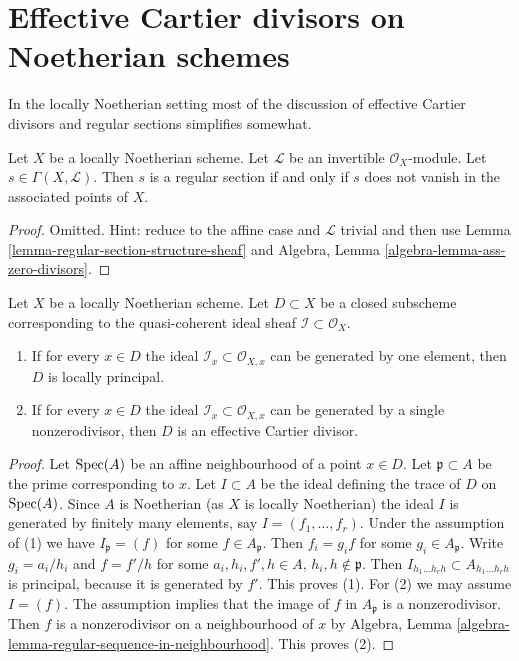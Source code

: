 \section{Effective Cartier divisors on Noetherian schemes}
\label{section-Noetherian-effective-Cartier}

\noindent
In the locally Noetherian setting most of the discussion of
effective Cartier divisors and regular sections simplifies somewhat.

\begin{lemma}
\label{lemma-regular-section-associated-points}
Let $X$ be a locally Noetherian scheme. Let $\mathcal{L}$ be an invertible
$\mathcal{O}_X$-module. Let $s \in \Gamma(X, \mathcal{L})$. Then $s$
is a regular section if and only if $s$ does not vanish in the associated
points of $X$.
\end{lemma}

\begin{proof}
Omitted. Hint: reduce to the affine case and $\mathcal{L}$ trivial
and then use Lemma \ref{lemma-regular-section-structure-sheaf} and
Algebra, Lemma \ref{algebra-lemma-ass-zero-divisors}.
\end{proof}

\begin{lemma}
\label{lemma-effective-Cartier-in-points}
Let $X$ be a locally Noetherian scheme. Let $D \subset X$ be a closed subscheme
corresponding to the quasi-coherent ideal sheaf
$\mathcal{I} \subset \mathcal{O}_X$.
\begin{enumerate}
\item If for every $x \in D$ the ideal
$\mathcal{I}_x \subset \mathcal{O}_{X, x}$
can be generated by one element, then $D$ is locally principal.
\item If for every $x \in D$ the ideal
$\mathcal{I}_x \subset \mathcal{O}_{X, x}$
can be generated by a single nonzerodivisor, then $D$ is an
effective Cartier divisor.
\end{enumerate}
\end{lemma}

\begin{proof}
Let $\mathop{\mathrm{Spec}}(A)$ be an affine neighbourhood of a point $x \in D$.
Let $\mathfrak p \subset A$ be the prime corresponding to $x$.
Let $I \subset A$ be the ideal defining the trace of $D$ on
$\mathop{\mathrm{Spec}}(A)$. Since $A$ is Noetherian (as $X$ is locally Noetherian)
the ideal $I$ is generated by finitely many elements, say
$I = (f_1, \ldots, f_r)$. Under the assumption of (1) we have
$I_\mathfrak p = (f)$ for some $f \in A_\mathfrak p$.
Then $f_i = g_i f$ for some $g_i \in A_\mathfrak p$.
Write $g_i = a_i/h_i$ and $f = f'/h$ for some
$a_i, h_i, f', h \in A$, $h_i, h \not \in \mathfrak p$.
Then $I_{h_1 \ldots h_r h} \subset A_{h_1 \ldots h_r h}$ is
principal, because it is generated by $f'$. This proves (1).
For (2) we may assume $I = (f)$. The assumption implies
that the image of $f$ in $A_\mathfrak p$ is a nonzerodivisor.
Then $f$ is a nonzerodivisor on a neighbourhood of $x$ by
Algebra, Lemma \ref{algebra-lemma-regular-sequence-in-neighbourhood}.
This proves (2).
\end{proof}

